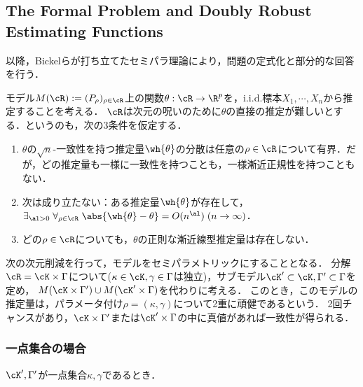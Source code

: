 \documentclass[uplatex,dvipdfmx]{jsreport}
\begin{document}
\subsection{The Formal Problem and Doubly Robust Estimating Functions}

\begin{tcolorbox}[colframe=ForestGreen, colback=ForestGreen!10!white,breakable,colbacktitle=ForestGreen!40!white,coltitle=black,fonttitle=\bfseries\sffamily,
title=]
    以降，Bickelらが打ち立てたセミパラ理論により，問題の定式化と部分的な回答を行う．
\end{tcolorbox}

\begin{notation}
    モデル$M(\cR):=(P_\rho)_{\rho\in\cR}$上の関数$\theta:\cR\to\R^p$を，i.i.d.標本$X_1,\cdots,X_n$から推定することを考える．
    $\cR$は次元の呪いのために$\theta$の直接の推定が難しいとする．というのも，次の3条件を仮定する．
    \begin{enumerate}
        \item $\theta$の$\sqrt{n}$-一致性を持つ推定量$\wh{\theta}$の分散は任意の$\rho\in\cR$について有界．だが，どの推定量も一様に一致性を持つことも，一様漸近正規性を持つこともない．
        \item 次は成り立たない：ある推定量$\wh{\theta}$が存在して，$\exists_{\al>0}\;\forall_{\rho\in\cR}\;\abs{\wh{\theta}-\theta}=O(n^\al)\;(n\to\infty)$．
        \item どの$\rho\in\cR$についても，$\theta$の正則な漸近線型推定量は存在しない．
    \end{enumerate}
\end{notation}

\begin{discussion}
    次の次元削減を行って，モデルをセミパラメトリックにすることとなる．
    分解$\cR=\cK\times\Gamma$について($\kappa\in\cK,\gamma\in\Gamma$は独立)，サブモデル$\cK'\subset\cK,\Gamma'\subset\Gamma$を定め，
    $M(\cK\times\Gamma')\cup M(\cK'\times\Gamma)$を代わりに考える．
    このとき，このモデルの推定量は，パラメータ付け$\rho=(\kappa,\gamma)$について2重に頑健であるという．
    2回チャンスがあり，$\cK\times\Gamma'$または$\cK'\times\Gamma$の中に真値があれば一致性が得られる．
\end{discussion}

\subsubsection{一点集合の場合}

\begin{tcolorbox}[colframe=ForestGreen, colback=ForestGreen!10!white,breakable,colbacktitle=ForestGreen!40!white,coltitle=black,fonttitle=\bfseries\sffamily,
title=]
    $\cK',\Gamma'$が一点集合$\kappa,\gamma$であるとき．
\end{tcolorbox}
\end{document}
